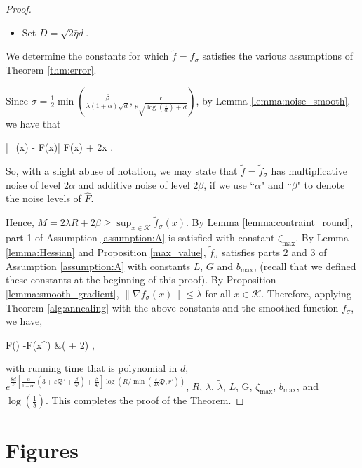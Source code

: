 \documentclass[final,12pt]{colt2018} %
\def \be{\begin{equs}}
\def \ee{\end{equs}}
\begin{document}
{\begin{proof}
\begin{itemize}
\item Set $D = \sqrt{2\bar{\eta} d}$.

\end{itemize}


\noindent We determine the constants for which $\tilde{f}= \tilde{f}_\sigma$ satisfies the various assumptions of Theorem \ref{thm:error}.

Since $\sigma  = \frac{1}{2} \min\left(\frac{\beta}{\lambda(1+\alpha)\sqrt{d}}, \frac{\mathsf{r}}{8\sqrt{\log(\frac{1}{\alpha})+d}}\right)$, by Lemma \ref{lemma:noise_smooth}, we have that
\be
|_\sigma(x) - F(x)| \alpha F(x) + 2\beta \quad \quad \forall x \in {}.
\ee
So, with a slight abuse of notation, we may state that $\tilde{f} = \tilde{f}_\sigma$ has multiplicative noise of level $2\alpha$ and additive noise of level $2\beta$, if we use ``$\alpha$" and ``$\beta$" to denote the noise levels of $\hat{F}$.

 Hence, $M = 2 \lambda R + 2 \beta \geq \sup_{x\in \mathcal{K}} \tilde{f}_\sigma(x)$.  
%
  By Lemma \ref{lemma:contraint_round}, part 1 of Assumption \ref{assumption:A} is satisfied with constant $\zeta_{\textrm{max}}$.  
%
 By Lemma \ref{lemma:Hessian} and Proposition \ref{max_value},  $\tilde{f}_\sigma$ satisfies parts 2 and 3 of Assumption \ref{assumption:A} with constants $L$, $G$ and $b_{\textrm{max}}$, (recall that we defined these constants at the beginning of this proof).  
%
  By Proposition \ref{lemma:smooth_gradient},  $\|\nabla \tilde{f}_\sigma(x) \| \leq \tilde{\lambda}$ for all $x \in \mathcal{K}$. 
 Therefore, applying Theorem \ref{alg:annealing} with the above constants and the smoothed function $f_\sigma$, we have, 
%
\be
 F() -F(x^\star) &\leq {}( + 2\beta) \leq \hat{\varepsilon},
\ee
%
with running time that is polynomial in $d$, $e^{\frac{8d}{\varepsilon} \left[\frac{\alpha}{1-\alpha^{\dagger}}\left(3+\varepsilon \mathfrak{B}' + \frac{\beta}{\mathfrak{D}}\right) + \frac{\beta}{\mathfrak{D}} \right] \log(R/\min(\frac{\varepsilon}{2\lambda} \mathfrak{D}, r'))}$, $R$, ${\lambda}$, ${\tilde{\lambda}}$, $L$, G, $\zeta_{\mathrm{max}}$, $b_{\mathrm{max}}$, and $\log(\frac{1}{\delta})$. This completes the proof of the Theorem.
\end{proof}





\section{Figures}\label{sec:figures}

}
\end{document}
